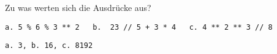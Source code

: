 \question[3]
Zu was werten sich die Ausdrücke aus?
\begin{lstlisting}
a. 5 % 6 % 3 ** 2   b.  23 // 5 + 3 * 4   c. 4 ** 2 ** 3 // 8

\end{lstlisting}
\begin{solutionbox}{2cm}
\begin{lstlisting}
a. 3, b. 16, c. 8192
\end{lstlisting}
\end{solutionbox}
